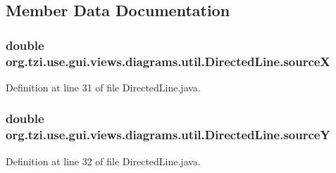 \subsection{Member Data Documentation}
\hypertarget{classorg_1_1tzi_1_1use_1_1gui_1_1views_1_1diagrams_1_1util_1_1_directed_line_a95565106a3a1ccfd0b6bd2646947e3d3}{
\subsubsection[{source\-X}]{\setlength{\rightskip}{0pt plus 5cm}double org.\-tzi.\-use.\-gui.\-views.\-diagrams.\-util.\-Directed\-Line.\-source\-X\hspace{0.3cm}{\ttfamily [protected]}}}\label{classorg_1_1tzi_1_1use_1_1gui_1_1views_1_1diagrams_1_1util_1_1_directed_line_a95565106a3a1ccfd0b6bd2646947e3d3}


Definition at line 31 of file Directed\-Line.\-java.

\hypertarget{classorg_1_1tzi_1_1use_1_1gui_1_1views_1_1diagrams_1_1util_1_1_directed_line_a301e913cfddf79f92d6f8d4eb9676fdb}{
\subsubsection[{source\-Y}]{\setlength{\rightskip}{0pt plus 5cm}double org.\-tzi.\-use.\-gui.\-views.\-diagrams.\-util.\-Directed\-Line.\-source\-Y\hspace{0.3cm}{\ttfamily [protected]}}}\label{classorg_1_1tzi_1_1use_1_1gui_1_1views_1_1diagrams_1_1util_1_1_directed_line_a301e913cfddf79f92d6f8d4eb9676fdb}


Definition at line 32 of file Directed\-Line.\-java.

